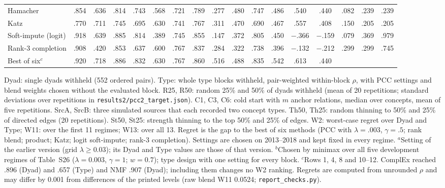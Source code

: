 \documentclass[journal]{IEEEtran}
\begin{document}
\begin{table}[!t]
\begin{tabular}{@{}l c c c c c c c c c c c c c c c c@{}}
Hamacher & .854 & .636 & .814 & .743 & .568 & .721 & .789 & .277 & .480 & .747 & .486 & .540 & .440 & .082 & .239 & .239\\
Katz & .770 & .711 & .745 & .695 & .630 & .741 & .767 & .311 & .470 & .690 & .467 & .557 & .408 & .150 & .205 & .205\\
Soft-impute (logit) & .918 & .639 & .885 & .814 & .389 & .745 & .855 & .147 & .372 & .805 & .450 & $-$.366 & $-$.159 & .079 & .369 & .979\\
Rank-3 completion & .908 & .420 & .853 & .637 & .600 & .767 & .837 & .284 & .322 & .738 & .396 & $-$.132 & $-$.212 & .299 & .299 & .745\\
\midrule
Best of six$^c$ & .920 & .718 & .886 & .832 & .630 & .767 & .860 & .516 & .488 & .835 & .542 & .613 & .440 & & & \\
\bottomrule
\end{tabular}
\smallskip
\parbox{\textwidth}{\scriptsize Dyad: single dyads withheld (552 ordered pairs). Type: whole type blocks withheld, pair-weighted within-block $\rho$, with PCC settings and blend weights chosen without the evaluated block. R25, R50: random 25\% and 50\% of dyads withheld (mean of 20 repetitions; standard deviations over repetitions in \texttt{results2/pcc2\_target.json}). C1, C3, C6: cold start with $m$ anchor relations, median over concepts, mean of five repetitions. SrcA, SrcB: three simulated sources that each recorded two concept types. Th50, Th25: random thinning to 50\% and 25\% of directed edges (20 repetitions). St50, St25: strength thinning to the top 50\% and 25\% of edges. W2: worst-case regret over Dyad and Type; W11: over the first 11 regimes; W13: over all 13. Regret is the gap to the best of six methods (PCC with $\lambda=.003$, $\gamma=.5$; rank blend; product; Katz; logit soft-impute; rank-3 completion). Settings are chosen on 2013--2018 and kept fixed in every regime. $^a$Setting of the earlier version (grid $\lambda\ge0.03$); its Dyad and Type values are those of that version. $^b$Chosen by minimax over all five development regimes of Table~S26 ($\lambda=0.003$, $\gamma=1$; $w=0.7$); type design with one setting for every block. $^c$Rows 1, 4, 8 and 10--12. ComplEx reached .896 (Dyad) and .657 (Type) and NMF .907 (Dyad); including them changes no W2 ranking. Regrets are computed from unrounded $\rho$ and may differ by 0.001 from differences of the printed levels (raw blend W11 0.0524; \texttt{report\_checks.py}).}
\end{table}
\end{document}
